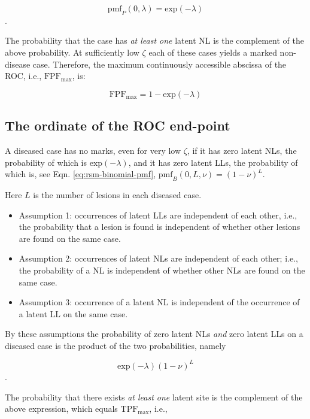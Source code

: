 \documentclass[
]{book}
\begin{document}
\[\text{pmf}_{P} \left (0,\lambda \right ) = \text{exp} \left ( -\lambda \right )\].

The probability that the case has \emph{at least one} latent NL is the complement of the above probability. At sufficiently low \(\zeta\) each of these cases yields a marked non-disease case. Therefore, the maximum continuously accessible abscissa of the ROC, i.e., \(\text{FPF}_{\text{max}}\), is:

\begin{equation} 
\text{FPF}_{\text{max}} = 1 - \text{exp} \left ( -\lambda \right )
\label{eq:rsm-predictions-fpf-max}
\end{equation}

\hypertarget{rsm-predictions-constrained-end-point-ordinate}{%
\subsection{The ordinate of the ROC end-point}\label{rsm-predictions-constrained-end-point-ordinate}}

A diseased case has no marks, even for very low \(\zeta\), if it has zero latent NLs, the probability of which is \(\text{exp}(-\lambda)\), and it has zero latent LLs, the probability of which is, see Eqn. \eqref{eq:rsm-binomial-pmf}, \(\text{pmf}_{B} \left ( 0, L, \nu \right )= (1 - \nu)^L\).

Here \(L\) is the number of lesions in each diseased case.

\begin{itemize}
\item
  Assumption 1: occurrences of latent LLs are independent of each other, i.e., the probability that a lesion is found is independent of whether other lesions are found on the same case.
\item
  Assumption 2: occurrences of latent NLs are independent of each other; i.e., the probability of a NL is independent of whether other NLs are found on the same case.
\item
  Assumption 3: occurrence of a latent NL is independent of the occurrence of a latent LL on the same case.
\end{itemize}

By these assumptions the probability of zero latent NLs \emph{and} zero latent LLs on a diseased case is the product of the two probabilities, namely

\[\text{exp}(-\lambda) (1 - \nu)^L\].

The probability that there exists \emph{at least one} latent site is the complement of the above expression, which equals \(\text{TPF}_{\text{max}}\), i.e.,
\end{document}
